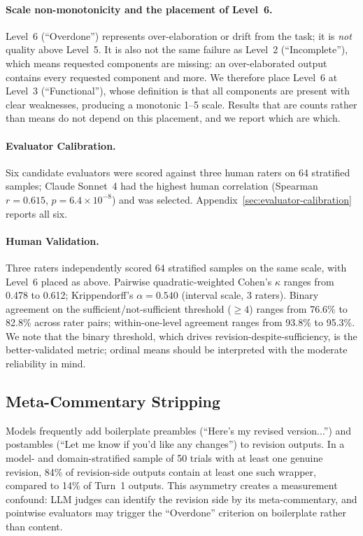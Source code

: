 \paragraph{Scale non-monotonicity and the placement of Level~6.}
Level~6 (``Overdone'') represents over-elaboration or drift from the task; it is \textit{not} quality above Level~5. It is also not the same failure as Level~2 (``Incomplete''), which means requested components are missing: an over-elaborated output contains every requested component and more. We therefore place Level~6 at Level~3 (``Functional''), whose definition is that all components are present with clear weaknesses, producing a monotonic 1--5 scale. Results that are counts rather than means do not depend on this placement, and we report which are which.

\paragraph{Evaluator Calibration.} Six candidate evaluators were scored against three human
raters on 64 stratified samples; Claude Sonnet~4 had the highest human correlation
(Spearman $r = 0.615$, $p = 6.4 \times 10^{-8}$) and was selected. Appendix~\ref{sec:evaluator-calibration}
reports all six.

\paragraph{Human Validation.}
Three raters independently scored 64 stratified samples on the same scale, with Level~6 placed as above. Pairwise quadratic-weighted Cohen's $\kappa$ ranges from 0.478 to 0.612; Krippendorff's $\alpha = 0.540$ (interval scale, 3 raters). Binary agreement on the sufficient/not-sufficient threshold ($\geq 4$) ranges from 76.6\% to 82.8\% across rater pairs; within-one-level agreement ranges from 93.8\% to 95.3\%. We note that the binary threshold, which drives revision-despite-sufficiency, is the better-validated metric; ordinal means should be interpreted with the moderate reliability in mind.

\subsection{Meta-Commentary Stripping}
\label{sec:methods-stripping}

Models frequently add boilerplate preambles (``Here's my revised version...'') and postambles (``Let me know if you'd like any changes'') to revision outputs. In a model- and domain-stratified sample of 50 trials with at least one genuine revision, 84\% of revision-side outputs contain at least one such wrapper, compared to 14\% of Turn~1 outputs. This asymmetry creates a measurement confound: LLM judges can identify the revision side by its meta-commentary, and pointwise evaluators may trigger the ``Overdone'' criterion on boilerplate rather than content.

